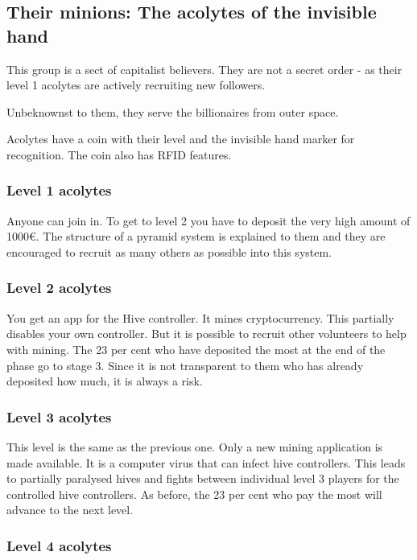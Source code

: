 \subsection{Their minions: The acolytes of the invisible hand}
\label{sec:acolytes of the invisible hand}

This group is a sect of capitalist believers. They are not a secret order - as their level 1 acolytes are actively recruiting new followers.

Unbeknownst to them, they serve the billionaires from outer space.

Acolytes have a coin with their level and the invisible hand marker for recognition. The coin also has RFID features.

\subsubsection{Level 1 acolytes}

Anyone can join in. To get to level 2 you have to deposit the very high amount of 1000€. The structure of a pyramid system is explained to them and they are encouraged to recruit as many others as possible into this system.

\subsubsection{Level 2 acolytes}

You get an app for the Hive controller. It mines cryptocurrency. This partially disables your own controller. But it is possible to recruit other volunteers to help with mining.
The 23 per cent who have deposited the most at the end of the phase go to stage 3. Since it is not transparent to them who has already deposited how much, it is always a risk.

\subsubsection{Level 3 acolytes}

This level is the same as the previous one. Only a new mining application is made available. It is a computer virus that can infect hive controllers. This leads to partially paralysed hives and fights between individual level 3 players for the controlled hive controllers.
As before, the 23 per cent who pay the most will advance to the next level.

\subsubsection{Level 4 acolytes}

